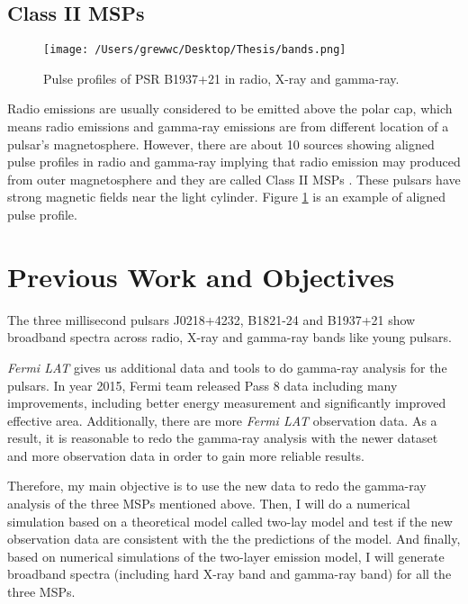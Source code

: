 \documentclass[12pt]{report}
\begin{document}
        \subsection{Class II MSPs}
          \begin{figure}[h]   
            \centering
            \texttt{[image: /Users/grewwc/Desktop/Thesis/bands.png]}
            \caption{Pulse profiles of PSR B1937+21 in radio, X-ray and gamma-ray.
              \protect \cite{0004-637X-787-2-167}}
            \label{fig:class }
          \end{figure}	 
          Radio emissions are usually considered to be emitted above the polar cap, which means
          radio emissions and gamma-ray emissions are from different location of a pulsar's 
          magnetosphere. However, there are about 10 sources showing aligned pulse profiles in 
          radio and gamma-ray implying that radio emission may produced from outer 
          magnetosphere and they are called Class II MSPs \cite{0004-637X-744-1-33}.
          These pulsars have strong magnetic fields near the light cylinder. 
          Figure \ref{fig:class } is an example of aligned pulse profile.

      \section{Previous Work and Objectives}
        The three millisecond pulsars J0218+4232, B1821-24 and B1937+21 show 
        broadband spectra across radio, X-ray and gamma-ray bands like young pulsars. 




        \textit{Fermi LAT} gives us additional data and tools to do gamma-ray analysis for the pulsars. 
        In year 2015, Fermi team released Pass 8 data including many improvements, including 
        better energy measurement and significantly improved effective area. Additionally, 
        there are more \textit{Fermi LAT} observation data. As a result, it is reasonable to 
        redo the gamma-ray analysis with the newer dataset and more observation data in order 
        to gain more reliable results. 

        Therefore, my main objective is to use the new data to redo the gamma-ray
        analysis of the three MSPs mentioned above. Then, I will do a numerical simulation 
        based on a theoretical model called two-lay model and test if the new observation 
        data are consistent with the the predictions of the model. And finally, based on 
        numerical simulations of the two-layer emission model, I will generate broadband 
        spectra (including hard X-ray band and gamma-ray band) for all the three MSPs. 
\end{document}
